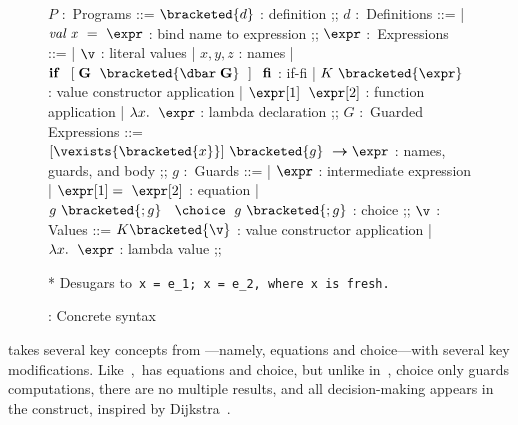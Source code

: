 \documentclass[manuscript,screen 12pt, nonacm]{acmart}
\begin{document}
        \begin{figure}[H]
          \begin{center}
            \begin{bnf}
            $P$ :~\textsf{Programs} ::=
            $\bracketed{d}$ : definition
            ;;
            $d$ :~\textsf{Definitions} ::=
            | $\it{val}\; x\;~\it{=}\;~\expr$ : bind name to expression
            ;;
            $\expr$ :~\textsf{Expressions} ::=
            | $\v$ : literal values 
            | $x, y, z$ : names
            | $\bf{if}\;~\left[\; G\;~\bracketed{\dbar\; G}\;~\right]\;~\bf{fi}$ : if-fi 
            | $K~\bracketed{\expr}$ : value constructor application 
            | $\expr[1]\;~\expr[2]$ : function application 
            | $\lambda x.\;~\expr$ : lambda declaration 
            ;;
            $G$ :~\textsf{Guarded Expressions} ::=  
            $[\vexists{\bracketed{x}}]~\bracketed{g}~\boldsymbol{\rightarrow}\expr$ : names, guards, and body
            ;;
            $g$ :~\textsf{Guards} ::=  
            | $\expr$ : intermediate expression 
            | $\expr[1] =~\expr[2]$ : equation 
            | $ g~\bracketed{; g}~\;~\choice~\; g~\bracketed{; g}$ : choice 
            ;;
            $\v$ : Values ::= $K\bracketed{\v}$ : value constructor application 
            | $\lambda x.\;~\expr$ : lambda value
            ;;
            \end{bnf}
            \medskip
          * Desugars to~\tt{x = e\_{1}; x = e\_{2}}, where~\tt{x} is fresh. 
          \end{center}
              \caption{\VMinus: Concrete syntax}
              \label{fig:vmsyntax}
              \end{figure}      

        \VMinus takes several key concepts from {\VC}---namely, equations and
        choice---with several key modifications. Like~\VC,~\VMinus has
        equations and choice, but unlike in~\VC, choice only guards computations, 
        there are no multiple results, and all decision-making appears in the 
        \iffibf construct, inspired by Dijkstra~\citep{dijkstra}. 
      
\end{document}
